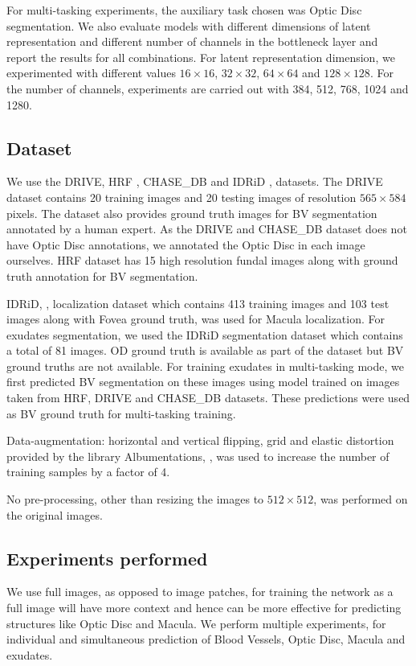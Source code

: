 \documentclass[utf8]{FrontiersinHarvard} %
\begin{document}
For multi-tasking experiments, the auxiliary task chosen was Optic Disc segmentation. We also evaluate models with different dimensions of latent representation and different number of channels  in the bottleneck layer and report the results for all combinations. For latent representation dimension, we experimented with different values $16\times16$, $32\times32$, $64\times64$ and $128\times128$. For the number of channels, experiments are carried out with 384, 512, 768, 1024 and 1280.

\subsection{Dataset}
We use the DRIVE, HRF \cite{budai2013robust}, CHASE\_DB and IDRiD \cite{h25w98-18}, datasets. The DRIVE dataset contains 20 training images and 20 testing images of resolution $565 \times 584$ pixels. The dataset also provides ground truth images for BV segmentation annotated by a human expert. As the DRIVE and CHASE\_DB dataset does not have Optic Disc annotations, we annotated the Optic Disc in each image ourselves. HRF dataset has 15 high resolution fundal images along with ground truth annotation for BV segmentation.

IDRiD, \cite{h25w98-18}, localization dataset which contains 413 training images and 103 test images along with Fovea ground truth, was used for Macula localization. For exudates segmentation, we used the IDRiD segmentation dataset which contains a total of 81 images. OD ground truth is available as part of the dataset but BV ground truths are not available. For training exudates in multi-tasking mode, we first predicted BV segmentation on these images using model trained on images taken from HRF, DRIVE and CHASE\_DB datasets. These  predictions were used as BV ground truth for multi-tasking training.

Data-augmentation: horizontal and vertical flipping, grid and elastic distortion provided by the library Albumentations, \cite{buslaev2020albumentations}, was used  to increase the number of training samples by a factor of 4.

No pre-processing, other than resizing the images to $512\times512$, was performed on the original images.

\subsection{Experiments performed}
We use full images, as opposed to image patches, for training the network  as a full image will have more context and hence can be more effective for predicting structures like Optic Disc and Macula. We perform multiple experiments, for individual and simultaneous prediction of Blood Vessels, Optic Disc, Macula and exudates.
\end{document}

